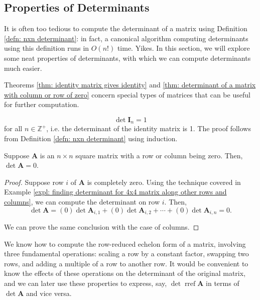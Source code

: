 \documentclass[]{book}
\DeclareMathOperator{\rref}{rref}
\newcommand{\mat}[1]{\ensuremath{\mathbf{#1}}}
\newcommand{\idmat}[1][n]{\ensuremath{\mat{I}_#1}}
\begin{document}
\subsection{Properties of Determinants}
\label{section: properties of determinants}
It is often too tedious to compute the determinant of a matrix using Definition \ref{defn: nxn determinant}: in fact, a canonical algorithm computing determinants using this definition runs in $O(n!)$ time. Yikes. In this section, we will explore some neat properties of determinants, with which we can compute determinants much easier.

Theorems \ref{thm: identity matrix gives identity} and \ref{thm: determinant of a matrix with column or row of zero} concern special types of matrices that can be useful for further computation.
\begin{theorem}
    \label{thm: determinant of identity matrix}
    \[\det\idmat[n] = 1\]
    for all $n \in \mathbb{Z}^+$, i.e. the determinant of the identity matrix is 1. The proof follows from Definition \ref{defn: nxn determinant} using induction.
\end{theorem}
\begin{theorem}
    \label{thm: determinant of a matrix with column or row of zero}
    Suppose $\mat{A}$ is an $n \times n$ square matrix with a row or column being zero. Then, $\det\mat{A} = 0$.
\begin{proof}
    Suppose row $i$ of $\mat{A}$ is completely zero. Using the technique covered in Example \ref{expl: finding determinant for 4x4 matrix along other rows and columns}, we can compute the determinant on row $i$. Then,
    \[\det\mat{A} = (0)\det\mat{A}_{i,1} + (0)\det\mat{A}_{i,2} + \cdots + (0)\det\mat{A}_{i,n} = 0.\]
    
    We can prove the same conclusion with the case of columns.
\end{proof}
\end{theorem}

We know how to compute the row-reduced echelon form of a matrix, involving three fundamental operations: scaling a row by a constant factor, swapping two rows, and adding a multiple of a row to another row. It would be convenient to know the effects of these operations on the determinant of the original matrix, and we can later use these properties to express, say, $\det\rref\mat{A}$ in terms of $\det\mat{A}$ and vice versa.
\end{document}
